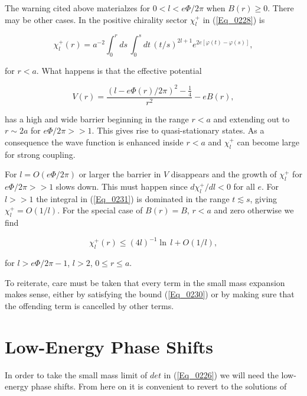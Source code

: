 \documentclass[a4paper,twocolumn,showpacs,preprintnumbers,amsmath,amssymb]{revtex4}
\begin{document}
The warning cited above materialzes for $0 < l < e\Phi/2\pi$
when $B(r) \geq 0$. There may be other cases. In the positive chirality
sector $\chi^{+}_l$ in (\ref{Eq_0228}) is

\begin{equation}
\label{Eq_0231}
\chi^{+}_l(r) = a^{-2} \int^r_0 ds \, \int^s_0 dt \,
  (t/s)^{2l + 1} e^{2e[\varphi(t) - \varphi(s)]},
\end{equation}

\noindent
for $r < a$. What happens is that the effective potential

\begin{equation}
\label{Eq_0232}
V(r) = \frac{(l - e\Phi(r)/2\pi)^2 - \frac{1}{4}}{r^2} - eB(r),
\end{equation}

\noindent
has a high and wide barrier beginning in the range $r < a$ and
extending out to $r \sim 2a$ for $e\Phi/2\pi >> 1$. This gives rise to
quasi-stationary states. As a consequence the wave function is
enhanced inside $r < a$ and $\chi^{+}_l$ can become large for strong
coupling.

For $l = O(e\Phi/2\pi)$ or larger the barrier in $V$ disappears and the
growth of $\chi^{+}_l$ for $e\Phi/2\pi >> 1$ slows down. This must
happen since $d\chi^{+}_l/dl < 0$ for all $e$. For $l >> 1$ the
integral in (\ref{Eq_0231}) is dominated in the range $t \lesssim s$, giving
$\chi^{+}_l = O(1/l)$. For the special case of $B(r) = B$, $r < a$ and
zero otherwise we find

\begin{equation}
\label{Eq_0233}
\chi^{+}_l(r) \leq (4l)^{-1} \ln \, l + O(1/l),
\end{equation}

\noindent
for $l > e\Phi/2\pi - 1$, $l > 2$, $0 \leq r \leq a$.

To reiterate, care must be taken that every term in the small
mass expansion makes sense, either by satisfying the bound
(\ref{Eq_0230}) or by making sure that the offending term is cancelled
by other terms.



\section{\label{Sec_SecIII}
Low-Energy Phase Shifts}

In order to take the small mass limit of $det$ in (\ref{Eq_0226}) we
will need the low-energy phase shifts. From here on it is convenient
to revert to the solutions of
\end{document}
